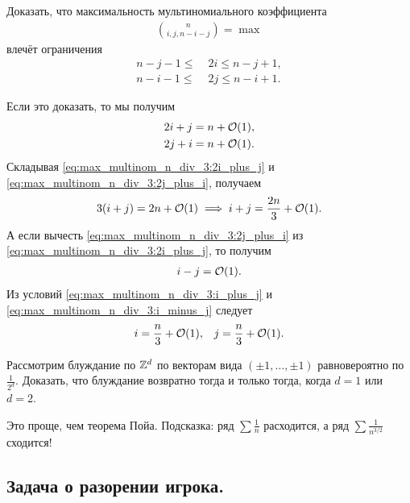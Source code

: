 \documentclass[../main.tex]{subfiles}
\begin{document}
 \begin{exercs}
  \label{exercise:max_multinom_n_div_3}
  Доказать, что  максимальность мультиномиального коэффициента
  \begin{align*}
   \binom{n}{i,j,n-i-j} = \max
  \end{align*} влечёт ограничения
  \begin{align*}
   n-j-1 \leqslant &\;2i \leqslant n - j + 1,\\
   n-i-1 \leqslant &\;2j \leqslant n - i + 1.
  \end{align*}

  Если это доказать, то мы получим
  \begin{align}
   \label{eq:max_multinom_n_div_3:2i_plus_j} 2i + j = n + \mathcal{O}(1),\\
   \label{eq:max_multinom_n_div_3:2j_plus_i} 2j + i = n + \mathcal{O}(1).
  \end{align} Складывая \eqref{eq:max_multinom_n_div_3:2i_plus_j} и \eqref{eq:max_multinom_n_div_3:2j_plus_i}, получаем
  \begin{align}
   \label{eq:max_multinom_n_div_3:i_plus_j}
   3(i + j) = 2n + \mathcal{O}(1) \implies i + j = \frac{2n}{3} + \mathcal{O}(1).
  \end{align} А если вычесть \eqref{eq:max_multinom_n_div_3:2j_plus_i} из \eqref{eq:max_multinom_n_div_3:2i_plus_j}, то получим
  \begin{align}
   \label{eq:max_multinom_n_div_3:i_minus_j}
   i - j = \mathcal{O}(1).
  \end{align} Из условий \eqref{eq:max_multinom_n_div_3:i_plus_j} и \eqref{eq:max_multinom_n_div_3:i_minus_j} следует
  \begin{align*}
   i = \frac{n}{3} + \mathcal{O}(1), && j = \frac{n}{3} + \mathcal{O}(1).
  \end{align*}
 \end{exercs}
 \begin{exercs*}
  Рассмотрим блуждание по $ \mathbb{Z}^{d} $ по векторам вида $ (\pm 1, \ldots, \pm 1) $ равновероятно по $ \frac{1}{2^{d}} $. Доказать, что блуждание возвратно тогда и только тогда, когда $ d = 1 $ или $ d = 2 $.

  Это проще, чем теорема Пойа. Подсказка: ряд $ \sum \frac{1}{n} $ расходится, а ряд $ \sum \frac{1}{n^{3 / 2}} $ сходится!
 \end{exercs*}

 \subsection{Задача о разорении игрока.}
\end{document}
